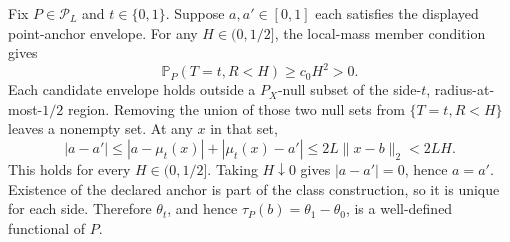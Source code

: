 Fix \(P\in\mathcal P_L\) and \(t\in\{0,1\}\).  Suppose \(a,a'\in[0,1]\) each satisfies the displayed point-anchor envelope.  For any \(H\in(0,1/2]\), the local-mass member condition gives
\[
 \mathbb P_P(T=t,R<H)\geq c_0H^2>0.
\]
Each candidate envelope holds outside a \(P_X\)-null subset of the side-\(t\), radius-at-most-\(1/2\) region.  Removing the union of those two null sets from \(\{T=t,R<H\}\) leaves a nonempty set.  At any \(x\) in that set,
\[
 |a-a'|
 \leq|a-\mu_t(x)|+|\mu_t(x)-a'|
 \leq2L\lVert x-b\rVert_2
 <2LH.
\]
This holds for every \(H\in(0,1/2]\).  Taking \(H\downarrow0\) gives \(|a-a'|=0\), hence \(a=a'\).  Existence of the declared anchor is part of the class construction, so it is unique for each side.  Therefore \(\theta_t\), and hence \(\tau_P(b)=\theta_1-\theta_0\), is a well-defined functional of \(P\).